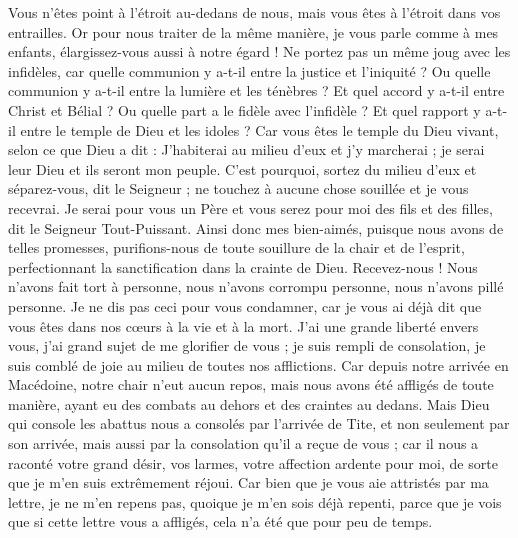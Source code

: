 \begin{multicols}{2}
Vous n'êtes point à l'étroit au-dedans de nous, mais vous êtes à l'étroit dans vos entrailles.
Or pour nous traiter de la même manière, je vous parle comme à mes enfants, élargissez-vous aussi à notre égard !
Ne portez pas un même joug avec les infidèles, car quelle communion y a-t-il entre la justice et l'iniquité ? Ou quelle communion y a-t-il entre la lumière et les ténèbres ?
Et quel accord y a-t-il entre Christ et Bélial ? Ou quelle part a le fidèle avec l'infidèle ?
Et quel rapport y a-t-il entre le temple de Dieu et les idoles ? Car vous êtes le temple du Dieu vivant, selon ce que Dieu a dit : J'habiterai au milieu d'eux et j'y marcherai ; je serai leur Dieu et ils seront mon peuple.
C'est pourquoi, sortez du milieu d'eux et séparez-vous, dit le Seigneur ; ne touchez à aucune chose souillée et je vous recevrai.
Je serai pour vous un Père et vous serez pour moi des fils et des filles, dit le Seigneur Tout-Puissant.
\VerseOne{}Ainsi donc mes bien-aimés, puisque nous avons de telles promesses, purifions-nous de toute souillure de la chair et de l'esprit, perfectionnant la sanctification dans la crainte de Dieu.
Recevez-nous ! Nous n'avons fait tort à personne, nous n'avons corrompu personne, nous n'avons pillé personne.
Je ne dis pas ceci pour vous condamner, car je vous ai déjà dit que vous êtes dans nos cœurs à la vie et à la mort.
J'ai une grande liberté envers vous, j'ai grand sujet de me glorifier de vous ; je suis rempli de consolation, je suis comblé de joie au milieu de toutes nos afflictions.
Car depuis notre arrivée en Macédoine, notre chair n'eut aucun repos, mais nous avons été affligés de toute manière, ayant eu des combats au dehors et des craintes au dedans.
Mais Dieu qui console les abattus nous a consolés par l'arrivée de Tite,
et non seulement par son arrivée, mais aussi par la consolation qu'il a reçue de vous ; car il nous a raconté votre grand désir, vos larmes, votre affection ardente pour moi, de sorte que je m'en suis extrêmement réjoui.
Car bien que je vous aie attristés par ma lettre, je ne m'en repens pas, quoique je m'en sois déjà repenti, parce que je vois que si cette lettre vous a affligés, cela n'a été que pour peu de temps.

\end{multicols}
